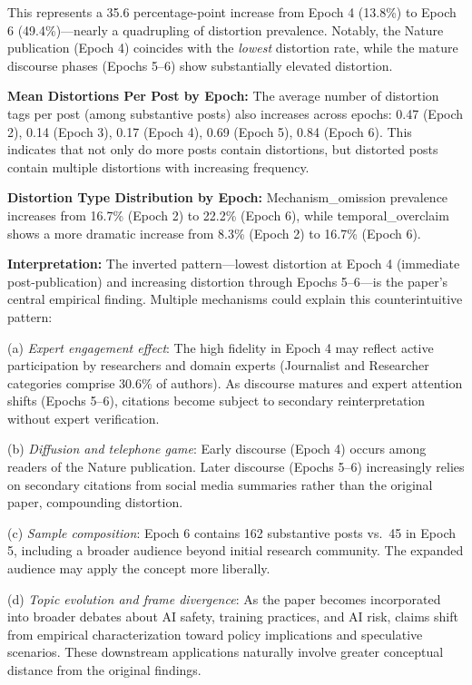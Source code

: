 \documentclass[twocolumn,11pt]{article}
\begin{document}
This represents a 35.6 percentage-point increase from Epoch 4 (13.8\%) to Epoch 6 (49.4\%)—nearly a quadrupling of distortion prevalence. Notably, the Nature publication (Epoch 4) coincides with the \textit{lowest} distortion rate, while the mature discourse phases (Epochs 5--6) show substantially elevated distortion.

\textbf{Mean Distortions Per Post by Epoch:} The average number of distortion tags per post (among substantive posts) also increases across epochs: 0.47 (Epoch 2), 0.14 (Epoch 3), 0.17 (Epoch 4), 0.69 (Epoch 5), 0.84 (Epoch 6). This indicates that not only do more posts contain distortions, but distorted posts contain multiple distortions with increasing frequency.

\textbf{Distortion Type Distribution by Epoch:} Mechanism\_omission prevalence increases from 16.7\% (Epoch 2) to 22.2\% (Epoch 6), while temporal\_overclaim shows a more dramatic increase from 8.3\% (Epoch 2) to 16.7\% (Epoch 6).

\textbf{Interpretation:} The inverted pattern—lowest distortion at Epoch 4 (immediate post-publication) and increasing distortion through Epochs 5--6—is the paper's central empirical finding. Multiple mechanisms could explain this counterintuitive pattern:

(a) \textit{Expert engagement effect}: The high fidelity in Epoch 4 may reflect active participation by researchers and domain experts (Journalist and Researcher categories comprise 30.6\% of authors). As discourse matures and expert attention shifts (Epochs 5--6), citations become subject to secondary reinterpretation without expert verification.

(b) \textit{Diffusion and telephone game}: Early discourse (Epoch 4) occurs among readers of the Nature publication. Later discourse (Epochs 5--6) increasingly relies on secondary citations from social media summaries rather than the original paper, compounding distortion.

(c) \textit{Sample composition}: Epoch 6 contains 162 substantive posts vs.\ 45 in Epoch 5, including a broader audience beyond initial research community. The expanded audience may apply the concept more liberally.

(d) \textit{Topic evolution and frame divergence}: As the paper becomes incorporated into broader debates about AI safety, training practices, and AI risk, claims shift from empirical characterization toward policy implications and speculative scenarios. These downstream applications naturally involve greater conceptual distance from the original findings.
\end{document}
